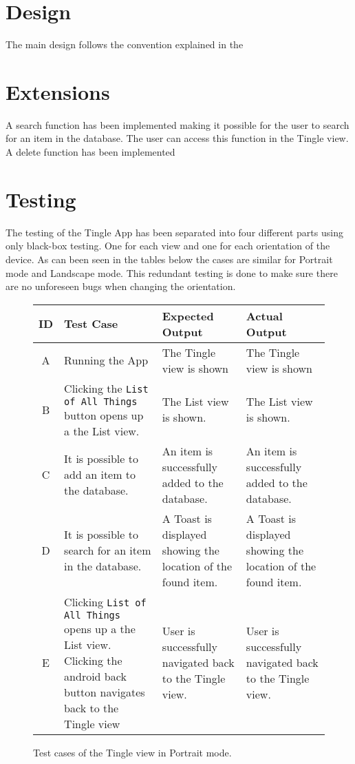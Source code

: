 \section{Design}
The main design follows the convention explained in the 

\section{Extensions }
A search function has been implemented making it possible for the user to search for an item in the database.
The user can access this function in the Tingle view.
A delete function has been implemented

\section{Testing}
The testing of the Tingle App has been separated into four different parts using only black-box testing. One for each view and one for each orientation of the device. As can been seen in the tables below the cases are similar for Portrait mode and Landscape mode. This redundant testing is done to make sure there are no unforeseen bugs when changing the orientation.

\begin{figure}[H]
	\renewcommand*{\arraystretch}{1.5} %
	\begin{tabular}{| c | p{3.5cm} | p{3.5cm} | p{3.5cm} |}
		\hline
		{\textbf{ID} } & {\textbf{Test Case} } & {\textbf{Expected Output}} & {\textbf {Actual Output}} \\\hline\hline
		A & Running the App & The Tingle view is shown & The Tingle view is shown  \\ \hline
		B &	Clicking the \texttt{List of All Things} button opens up a the List view. & The List view is shown. & The List view is shown. \\ \hline
		C & It is possible to add an item to the database. & An item is successfully added to the database. & An item is successfully added to the database. \\ \hline
		D & It is possible to search for an item in the database. & A Toast is displayed showing the location of the found item. & A Toast is displayed showing the location of the found item. \\ \hline
		E & Clicking \texttt{List of All Things} opens up a the List view. 
     Clicking the android back button navigates back to the Tingle view & User is successfully navigated back to the Tingle view. & User is successfully navigated back to the Tingle view.  \\ \hline
	\end{tabular}
	
	\caption{Test cases of the Tingle view in Portrait mode.}
	\label{tab:test-cases-tingle-portrait}
\end{figure}

